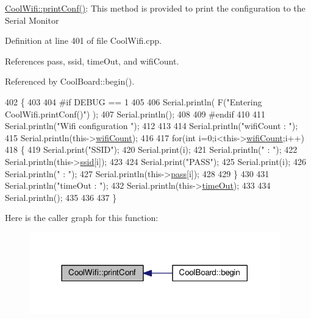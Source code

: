 \hyperlink{classCoolWifi_a9e6105c6d13d35ec510f6633da9e0223}{Cool\+Wifi\+::print\+Conf()}\+: This method is provided to print the configuration to the Serial Monitor 

Definition at line 401 of file Cool\+Wifi.\+cpp.



References pass, ssid, time\+Out, and wifi\+Count.



Referenced by Cool\+Board\+::begin().


\begin{DoxyCode}
402 \{
403 
404 \textcolor{preprocessor}{#if DEBUG == 1 }
405 
406     Serial.println( F(\textcolor{stringliteral}{"Entering CoolWifi.printConf()"}) );
407     Serial.println();   
408 
409 \textcolor{preprocessor}{#endif}
410     
411     Serial.println(\textcolor{stringliteral}{"Wifi configuration "});
412 
413     
414     Serial.println(\textcolor{stringliteral}{"wifiCount : "});
415     Serial.println(this->\hyperlink{classCoolWifi_ab133bd92fcb895b884deecd6678592e4}{wifiCount});
416     
417     \textcolor{keywordflow}{for}(\textcolor{keywordtype}{int} i=0;i<this->\hyperlink{classCoolWifi_ab133bd92fcb895b884deecd6678592e4}{wifiCount};i++)
418     \{   
419         Serial.print(\textcolor{stringliteral}{"SSID"});
420         Serial.print(i);
421         Serial.println(\textcolor{stringliteral}{" : "});
422         Serial.println(this->\hyperlink{classCoolWifi_a893b21d0fed821438733bba2e73fb4c2}{ssid}[i]);
423                 
424         Serial.print(\textcolor{stringliteral}{"PASS"});
425         Serial.print(i);
426         Serial.println(\textcolor{stringliteral}{" : "});
427         Serial.println(this->\hyperlink{classCoolWifi_a0c3332a149245aaad060b32593a54c9b}{pass}[i]);
428         
429     \}
430     
431     Serial.println(\textcolor{stringliteral}{"timeOut : "});
432     Serial.println(this->\hyperlink{classCoolWifi_a952111605f25156588b5632caaba1c6f}{timeOut});
433 
434     Serial.println();
435 
436 
437 \}
\end{DoxyCode}
Here is the caller graph for this function\+:\nopagebreak
\begin{figure}[H]
\begin{center}
\leavevmode
\includegraphics[width=308pt]{classCoolWifi_a9e6105c6d13d35ec510f6633da9e0223_icgraph}
\end{center}
\end{figure}
\mbox{\label{classCoolWifi_a1c7b4d82a4098d346e7593dce92039fa}} 
